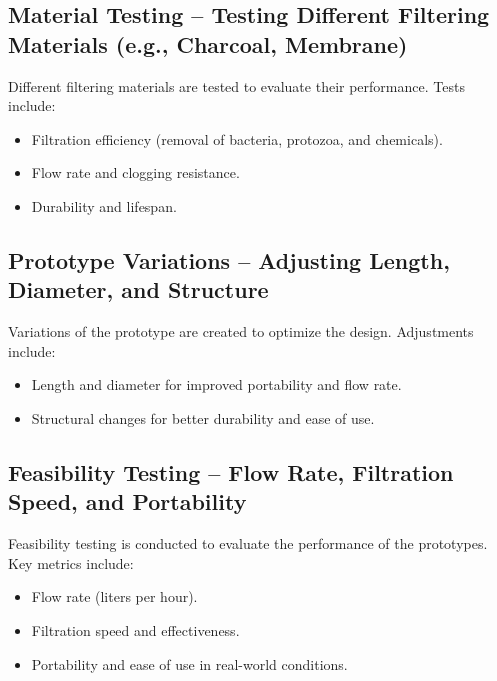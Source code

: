 \documentclass{article}
\begin{document}
\vspace{0.5cm}

\subsection{Material Testing – Testing Different Filtering Materials (e.g., Charcoal, Membrane)}
Different filtering materials are tested to evaluate their performance. Tests include:
\begin{itemize}
    \item Filtration efficiency (removal of bacteria, protozoa, and chemicals).
    \item Flow rate and clogging resistance.
    \item Durability and lifespan.
\end{itemize}

\vspace{0.5cm}

\subsection{Prototype Variations – Adjusting Length, Diameter, and Structure}
Variations of the prototype are created to optimize the design. Adjustments include:
\begin{itemize}
    \item Length and diameter for improved portability and flow rate.
    \item Structural changes for better durability and ease of use.
\end{itemize}

\vspace{0.5cm}

\subsection{Feasibility Testing – Flow Rate, Filtration Speed, and Portability}
Feasibility testing is conducted to evaluate the performance of the prototypes. Key metrics include:
\begin{itemize}
    \item Flow rate (liters per hour).
    \item Filtration speed and effectiveness.
    \item Portability and ease of use in real-world conditions.
\end{itemize}

\vspace{0.5cm}
\end{document}

